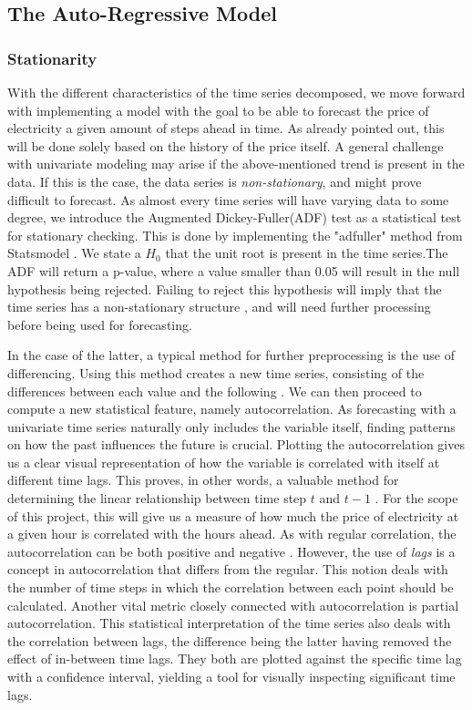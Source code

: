 \documentclass
[twocolumn,
secnumarabic,
nobibnotes,
aps,
prl,
reprint,
groupedaddress,
amsmath,
amssymb,
]{revtex4-2}
\begin{document}
\subsection{The Auto-Regressive Model}

\subsubsection{Stationarity}
With the different characteristics of the time series decomposed, we move forward with implementing a model with the goal to be able to forecast the price of electricity a given amount of steps ahead in time. As already pointed out, this will be done solely based on the history of the price itself. A general challenge with univariate modeling may arise if the above-mentioned trend is present in the data. If this is the case, the data series is \emph{non-stationary}, and might prove difficult to forecast. As almost every time series will have varying data to some degree, we introduce the Augmented Dickey-Fuller(ADF) test as a statistical test for stationary checking. This is done by implementing the "adfuller" method from Statsmodel \cite{seabold2010statsmodels}. We state a $H_0$ that the unit root is present in the time series.The ADF will return a p-value, where a value smaller than 0.05 will result in the null hypothesis being rejected. Failing to reject this hypothesis will imply that the time series has a non-stationary structure \cite{Vishwas2020}, and will need further processing before being used for forecasting.  

In the case of the latter, a typical method for further preprocessing is the use of differencing. Using this method creates a new time series, consisting of the differences between each value and the following \cite{Korstanje2021}. We can then proceed to compute a new statistical feature, namely autocorrelation. As forecasting with a univariate time series naturally only includes the variable itself, finding patterns on how the past influences the future is crucial. Plotting the autocorrelation gives us a clear visual representation of how the variable is correlated with itself at different time lags. This proves, in other words, a valuable method for determining the linear relationship between time step $t$ and $t-1$ \cite{Vishwas2020}. For the scope of this project, this will give us a measure of how much the price of electricity at a given hour is correlated with the hours ahead. As with regular correlation, the autocorrelation can be both positive and negative \cite{Korstanje2021}. However, the use of \emph{lags} is a concept in autocorrelation that differs from the regular. This notion deals with the number of time steps in which the correlation between each point should be calculated. 
Another vital metric closely connected with autocorrelation is partial autocorrelation. This statistical interpretation of the time series also deals with the correlation between lags, the difference being the latter having removed the effect of in-between time lags\cite{Vishwas2020}. They both are plotted against the specific time lag with a confidence interval, yielding a tool for visually inspecting significant time lags. 
\end{document}
